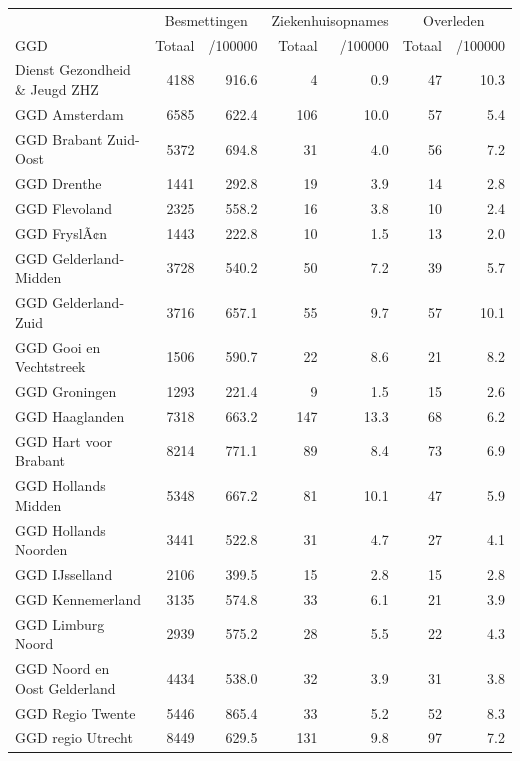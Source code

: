 \documentclass[
  english,
  man,floatsintext]{apa6}
\begin{document}
\begin{table}[H]
\centering\begingroup\fontsize{10}{12}\selectfont

\begin{threeparttable}
\begin{tabular}{lrrrrrr}
\toprule
\multicolumn{1}{c}{ } & \multicolumn{2}{c}{Besmettingen} & \multicolumn{2}{c}{Ziekenhuisopnames} & \multicolumn{2}{c}{Overleden} \\
\cmidrule(l{3pt}r{3pt}){2-3} \cmidrule(l{3pt}r{3pt}){4-5} \cmidrule(l{3pt}r{3pt}){6-7}
GGD & Totaal & /100000 & Totaal & /100000 & Totaal & /100000\\
\midrule
Dienst Gezondheid \& Jeugd ZHZ & 4188 & 916.6 & 4 & 0.9 & 47 & 10.3\\
GGD Amsterdam & 6585 & 622.4 & 106 & 10.0 & 57 & 5.4\\
GGD Brabant Zuid-Oost & 5372 & 694.8 & 31 & 4.0 & 56 & 7.2\\
GGD Drenthe & 1441 & 292.8 & 19 & 3.9 & 14 & 2.8\\
GGD Flevoland & 2325 & 558.2 & 16 & 3.8 & 10 & 2.4\\
GGD FryslÃ¢n & 1443 & 222.8 & 10 & 1.5 & 13 & 2.0\\
GGD Gelderland-Midden & 3728 & 540.2 & 50 & 7.2 & 39 & 5.7\\
GGD Gelderland-Zuid & 3716 & 657.1 & 55 & 9.7 & 57 & 10.1\\
GGD Gooi en Vechtstreek & 1506 & 590.7 & 22 & 8.6 & 21 & 8.2\\
GGD Groningen & 1293 & 221.4 & 9 & 1.5 & 15 & 2.6\\
GGD Haaglanden & 7318 & 663.2 & 147 & 13.3 & 68 & 6.2\\
GGD Hart voor Brabant & 8214 & 771.1 & 89 & 8.4 & 73 & 6.9\\
GGD Hollands Midden & 5348 & 667.2 & 81 & 10.1 & 47 & 5.9\\
GGD Hollands Noorden & 3441 & 522.8 & 31 & 4.7 & 27 & 4.1\\
GGD IJsselland & 2106 & 399.5 & 15 & 2.8 & 15 & 2.8\\
GGD Kennemerland & 3135 & 574.8 & 33 & 6.1 & 21 & 3.9\\
GGD Limburg Noord & 2939 & 575.2 & 28 & 5.5 & 22 & 4.3\\
GGD Noord en Oost Gelderland & 4434 & 538.0 & 32 & 3.9 & 31 & 3.8\\
GGD Regio Twente & 5446 & 865.4 & 33 & 5.2 & 52 & 8.3\\
GGD regio Utrecht & 8449 & 629.5 & 131 & 9.8 & 97 & 7.2\\

\end{tabular}
\end{threeparttable}
\end{table}
\end{document}

